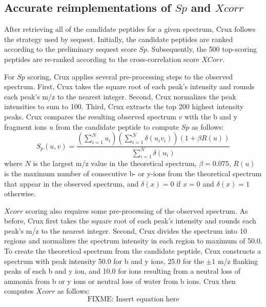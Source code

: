 \documentclass[12pt]{article}
\begin{document}
\subsection{Accurate reimplementations of $Sp$ and $Xcorr$}

After retrieving all of the candidate peptides for a given spectrum,
Crux follows the strategy used by {\sc sequest}.  Initially, the candidate
peptides are ranked according to the preliminary {\sc sequest} score $Sp$.
Subsequently, the 500 top-scoring peptides are re-ranked according to
the cross-correlation score $XCorr$.

For $Sp$ scoring, Crux applies several pre-processing steps to the
observed spectrum.  First, Crux takes the square root of each peak's
intensity and rounds each peak's m/z to the nearest integer.  Second,
Crux normalizes the peak intensities to sum to 100.  Third, Crux
extracts the top 200 highest intensity peaks.  Crux compares the
resulting observed spectrum $v$ with the b and y fragment ions $u$ from the
candidate peptide to compute $Sp$ as follows:
\[
S_p(u, v) = \frac{
\left(\sum_{i=1}^N u_i \right)
\left(\sum_{i=1}^N \delta(u_i v_i)\right)
\left(1 + \beta R(u) \right)
}{\sum_{i=1}^N \delta(u_i)}
\]
where $N$ is the largest m/z value in the theoretical spectrum, $\beta
= 0.075$, $R(u)$ is the maximum number of consecutive b- or y-ions
from the theoretical spectrum that appear in the observed spectrum,
and $\delta(x) = 0$ if $x=0$ and $\delta(x) = 1$ otherwise.

$Xcorr$ scoring also requires some pre-processing of the observed
spectrum.  As before, Crux first takes the square root of each peak's
intensity and rounds each peak's m/z to the nearest integer.  Second,
Crux divides the spectrum into 10 regions and normalizes the spectrum
intensity in each region to maximum of 50.0. To create the theoretical
spectrum from the candidate peptide, Crux constructs a spectrum with
peak intensity 50.0 for b and y ions, 25.0 for the $\pm 1$ m/z flanking
peaks of each b and y ion, and 10.0 for ions resulting from a neutral
loss of ammonia from b or y ions or neutral loss of water from b ions.
Crux then computes $Xcorr$ as follows:
\[
\mbox{FIXME: Insert equation here}
\]
\end{document}
